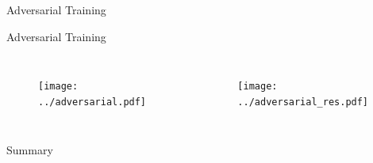 \documentclass[10pt]{beamer}
\begin{document}
\begin{frame}{Adversarial Training}

\end{frame}

\begin{frame}{Adversarial Training}
  \begin{columns}
    \begin{figure}[htp]
      \texttt{[image: ../adversarial.pdf]}
    \end{figure}
    \begin{figure}[htp]
      \texttt{[image: ../adversarial\_res.pdf]}
    \end{figure}
  \end{columns}
\end{frame}

\begin{frame}{Summary}

\end{frame}
\end{document}
